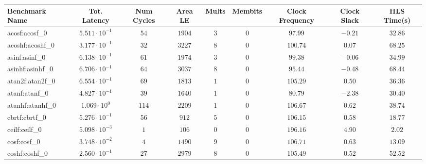 \begin{tabular}{|l|c|c|c|c|c|c|c|c|}
\hline
Benchmark Name               & Tot. Latency            & Num Cycles & Area LE   & Mults   & Membits    & Clock Frequency & Clock Slack & HLS Time(s) \\
\hline
acosf:acosf\_0               & $ 5.511 \cdot 10^{-1} $ & $ 54     $ & $ 1904  $ & $ 3   $ & $ 0      $ & $ 97.99       $ & $ -0.21   $ & $ 32.86   $ \\
acoshf:acoshf\_0             & $ 3.177 \cdot 10^{-1} $ & $ 32     $ & $ 3227  $ & $ 8   $ & $ 0      $ & $ 100.74      $ & $ 0.07    $ & $ 68.25   $ \\
asinf:asinf\_0               & $ 6.138 \cdot 10^{-1} $ & $ 61     $ & $ 1974  $ & $ 3   $ & $ 0      $ & $ 99.38       $ & $ -0.06   $ & $ 34.99   $ \\
asinhf:asinhf\_0             & $ 6.706 \cdot 10^{-1} $ & $ 64     $ & $ 3037  $ & $ 8   $ & $ 0      $ & $ 95.44       $ & $ -0.48   $ & $ 68.44   $ \\
atan2f:atan2f\_0             & $ 6.554 \cdot 10^{-1} $ & $ 69     $ & $ 1813  $ & $ 1   $ & $ 0      $ & $ 105.29      $ & $ 0.50    $ & $ 36.36   $ \\
atanf:atanf\_0               & $ 4.827 \cdot 10^{-1} $ & $ 39     $ & $ 1640  $ & $ 1   $ & $ 0      $ & $ 80.79       $ & $ -2.38   $ & $ 30.40   $ \\
atanhf:atanhf\_0             & $ 1.069 \cdot 10^{0}  $ & $ 114    $ & $ 2209  $ & $ 1   $ & $ 0      $ & $ 106.67      $ & $ 0.62    $ & $ 38.74   $ \\
cbrtf:cbrtf\_0               & $ 5.276 \cdot 10^{-1} $ & $ 56     $ & $ 912   $ & $ 5   $ & $ 0      $ & $ 106.15      $ & $ 0.58    $ & $ 18.77   $ \\
ceilf:ceilf\_0               & $ 5.098 \cdot 10^{-3} $ & $ 1      $ & $ 106   $ & $ 0   $ & $ 0      $ & $ 196.16      $ & $ 4.90    $ & $ 2.02    $ \\
cosf:cosf\_0                 & $ 3.748 \cdot 10^{-2} $ & $ 4      $ & $ 1490  $ & $ 9   $ & $ 0      $ & $ 106.71      $ & $ 0.63    $ & $ 13.09   $ \\
coshf:coshf\_0               & $ 2.560 \cdot 10^{-1} $ & $ 27     $ & $ 2979  $ & $ 8   $ & $ 0      $ & $ 105.49      $ & $ 0.52    $ & $ 52.52   $ \\

\end{tabular}
